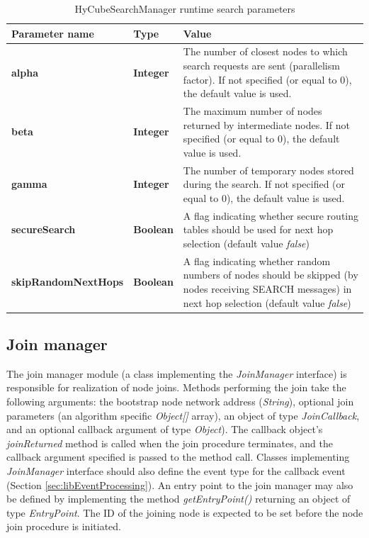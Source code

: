 \begin{table}
\scriptsize
\begin{center}
\begin{tabular}{p{3cm} p{2cm} p{9.5cm}}
	\hline
	\textbf{Parameter name}					& \textbf{Type}					& \textbf{Value}					\\[1mm]
    \hline
	\textbf{alpha}							& \textbf{Integer}				& The number of closest nodes to which search requests are sent (parallelism factor). If not specified (or equal to 0), the default value is used.		\\[1.5mm]
	\textbf{beta}							& \textbf{Integer}				& The maximum number of nodes returned by intermediate nodes. If not specified (or equal to 0), the default value is used.								\\[1.5mm]
	\textbf{gamma}							& \textbf{Integer}				& The number of temporary nodes stored during the search. If not specified (or equal to 0), the default value is used.									\\[1.5mm]
	\textbf{secureSearch}					& \textbf{Boolean}				& A flag indicating whether secure routing tables should be used for next hop selection (default value \emph{false})			\\[1.5mm]
	\textbf{skipRandomNextHops}				& \textbf{Boolean}				& A flag indicating whether random numbers of nodes should be skipped (by nodes receiving SEARCH messages) in next hop selection (default value \emph{false})		\\[1.5mm]
    \hline
\end{tabular}
\end{center}
\caption{HyCubeSearchManager runtime search parameters}
\label{tab:libHyCubeSearchManagerSearchParameters}
\end{table}









\subsection{Join manager}

The join manager module (a class implementing the \emph{JoinManager} interface) is responsible for realization of node joins. Methods performing the join take the following arguments: the bootstrap node network address (\emph{String}), optional join parameters (an algorithm specific \emph{Object[]} array), an object of type \emph{JoinCallback}, and an optional callback argument of type \emph{Object}). The callback object's \emph{joinReturned} method is called when the join procedure terminates, and the callback argument specified is passed to the method call. Classes implementing \emph{JoinManager} interface should also define the event type for the callback event (Section \ref{sec:libEventProcessing}). An entry point to the join manager may also be defined by implementing the method \emph{getEntryPoint()} returning an object of type \emph{EntryPoint}. The ID of the joining node is expected to be set before the node join procedure is initiated.

